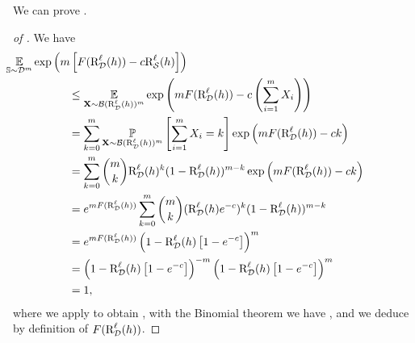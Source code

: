 \begin{noaddcontents}
We can prove .
\begin{proof}[of ] 
We have
\begingroup
\allowdisplaybreaks
\begin{align}
&\hspace{-2.0cm}\EE_{\S\sim\D^\m}\exp\LP \m \LB \catF(\RiskLoss_{\D}(\h)) - \cat\RiskLoss_{\dS}(\h)\RB\RP\nonumber\\
&\le \EE_{\Xbf\sim\Bernoulli(\RiskLoss_{\D}(\h))^\m}\exp\LP \m \catF(\RiskLoss_{\D}(\h)) - \cat\LP\sum_{i=1}^{\m}X_i\RP\RP\label{ap:pac-bayes:eq:proof-catoni-1-1}\\
&= \sum_{k=0}^{\m}\PP_{\Xbf\sim\Bernoulli(\RiskLoss_{\D}(\h))^\m}\LB \sum_{i=1}^{\m}X_i=k\RB \exp\LP\m \catF(\RiskLoss_{\D}(\h))-\cat k\RP\nonumber\\
&= \sum_{k=0}^{\m}\binom{\m}{\k}\RiskLoss_{\D}(\h)^k(1-\RiskLoss_{\D}(\h))^{\m-k}\exp\LP\m \catF(\RiskLoss_{\D}(\h))-\cat k\RP\nonumber\\
&= e^{\m \catF(\RiskLoss_{\D}(\h))}\sum_{k=0}^{\m}\binom{\m}{\k}(\RiskLoss_{\D}(\h)e^{-\cat})^k(1-\RiskLoss_{\D}(\h))^{\m-k}\nonumber\\
&= e^{\m \catF(\RiskLoss_{\D}(\h))}\LP1-\RiskLoss_{\D}(\h)\LB 1-e^{-\cat}\RB\RP^{\m}\label{ap:pac-bayes:eq:proof-catoni-1-2}\\
&= \LP1-\RiskLoss_{\D}(\h)\LB 1-e^{-\cat}\RB\RP^{-\m}\LP1-\RiskLoss_{\D}(\h)\LB 1-e^{-\cat}\RB\RP^{\m}\label{ap:pac-bayes:eq:proof-catoni-1-3}\\
&= 1\nonumber,
\end{align}
\endgroup
where we apply  to obtain , with the Binomial theorem we have , and we deduce  by definition of $F(\text{R}^{\ell}_{\mathcal{D}}(h))$.
\end{proof}
\end{noaddcontents}